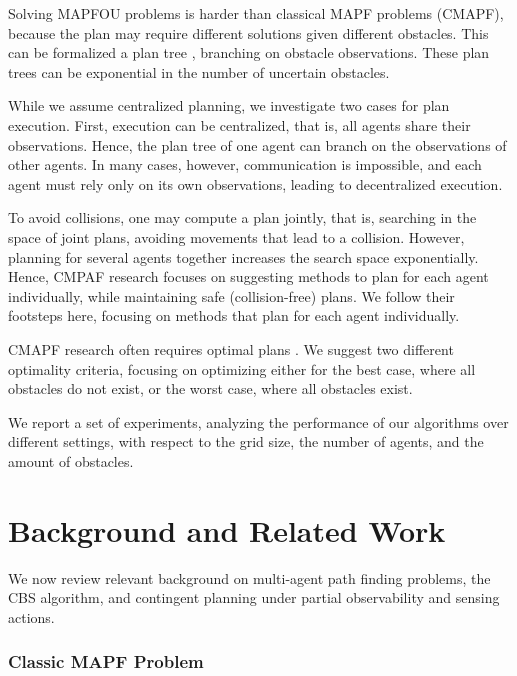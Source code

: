 \documentclass[letterpaper]{article} %
\begin{document}
Solving MAPFOU problems is harder than classical MAPF problems (CMAPF), because the plan may require different solutions given different obstacles. This can be formalized a  plan tree \cite{hoffmann2005contingent}, branching on obstacle observations. These plan trees can be exponential in the number of uncertain obstacles.

While we assume centralized planning, we investigate two cases for plan execution. First, execution can be centralized, that is, all agents share their observations. Hence, the plan tree of one agent can branch on the observations of other agents. In many cases, however, communication is impossible, and each agent must rely only on its own observations, leading to decentralized execution.

To avoid collisions, one may compute a plan jointly, that is, searching in the space of joint plans, avoiding movements that lead to a collision. However, planning for several agents together increases the search space exponentially. Hence, CMPAF research focuses on suggesting methods to plan for each agent individually, while maintaining safe (collision-free) plans. We follow their footsteps here, focusing on methods that plan for each agent individually.

CMAPF research often requires optimal plans \cite{stern2019multi}. We suggest two different optimality criteria, focusing on optimizing either for the best case, where all obstacles do not exist, or the worst case, where all obstacles exist.

We report a set of experiments, analyzing the performance of our algorithms over different settings, with respect to the grid size, the number of agents, and the amount of obstacles.





\section{Background and Related Work}

We now review relevant background on multi-agent path finding problems, the CBS algorithm, and contingent planning under partial observability and sensing actions.




\subsubsection{Classic MAPF Problem}
\end{document}
